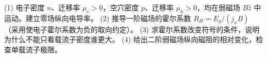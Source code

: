 (1) 电子密度 \(n\)、迁移率 \(\mu_e>0\)，空穴密度 \(p\)、迁移率 \(\mu_h>0\)，均在弱磁场 \(B\hat z\) 中运动。建立零场纵向电导率。
(2) 推导一阶磁场的霍尔系数 \(R_H=E_y/(j_xB)\)（采用使电子霍尔系数为负的取向约定）。
(3) 求霍尔系数改变符号的条件，说明为什么不能只看载流子密度谁更大。
(4) 给出二阶弱磁场纵向磁阻的相对变化，检查单载流子极限。
